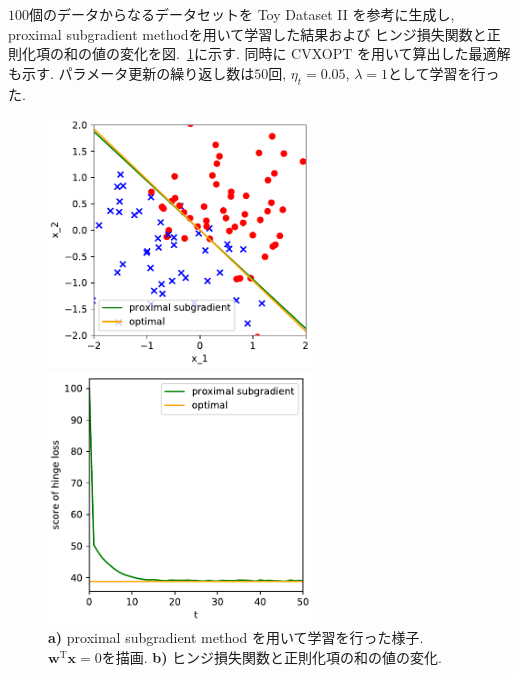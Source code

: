 \documentclass[a4paper,10pt]{jsarticle}
\begin{document}
$100$個のデータからなるデータセットを Toy Dataset I\hspace{-1pt}I を参考に生成し,
proximal subgradient methodを用いて学習した結果および
ヒンジ損失関数と正則化項の和の値の変化を図.~\ref{img:proximal-subgradient}に示す.
同時に CVXOPT を用いて算出した最適解も示す.
パラメータ更新の繰り返し数は$50$回, $\eta_t=0.05$, $\lambda=1$として学習を行った.
\begin{figure}[htbp]
 \begin{minipage}{0.5\hsize}
  \begin{center}
   \includegraphics[width=7cm]{figs/p4_proximal-subgradient_result.pdf}
  \end{center}
  \vspace{-0.5cm}
  \subcaption{}
 \end{minipage}
 \begin{minipage}{0.5\hsize}
  \begin{center}
   \includegraphics[width=7cm]{figs/p4_proximal-subgradient_loss.pdf}
  \end{center}
  \vspace{-0.5cm}
  \subcaption{}
 \end{minipage}
 \caption{\textbf{a)} proximal subgradient method を用いて学習を行った様子.
 $\bm{w}^\mathrm{T}\bm{x}=0$を描画.
 \textbf{b)} ヒンジ損失関数と正則化項の和の値の変化.}
 \label{img:proximal-subgradient}
\end{figure}
\end{document}
